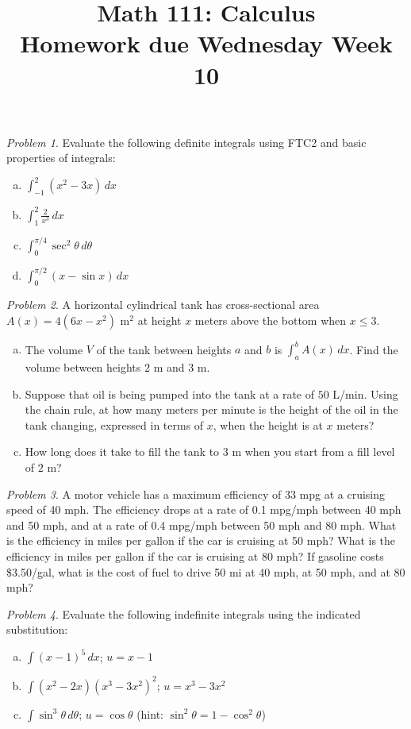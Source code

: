 \documentclass[11pt,twoside]{amsart}
\title{Math 111: Calculus\\ Homework due Wednesday Week 10}
\theoremstyle{plain}
\theoremstyle{remark}
\newtheorem{prob}{Problem}
\theoremstyle{definition}
\theoremstyle{definition}
\begin{document}
\maketitle

\begin{prob}
Evaluate the following definite integrals using FTC2 and basic properties of integrals:
\begin{enumerate}[(a)]
\item $\int_{-1}^2 (x^2-3x)\,dx$
\item $\int_{1}^2 \frac{2}{x^3}\,dx$
\item $\int_0^{\pi/4}\sec^2\theta\,d\theta$
\item $\int_0^{\pi/2}(x-\sin x)\,dx$
\end{enumerate}
\end{prob}

\begin{prob}
A horizontal cylindrical tank has cross-sectional area $A(x) = 4(6x-x^2)$ m$^2$ at height $x$ meters above the bottom when $x\le 3$.
\begin{enumerate}[(a)]
\item The volume $V$ of the tank between heights $a$ and $b$ is $\int_a^b A(x)\,dx$. Find the volume between heights $2$ m and $3$ m.
\item Suppose that oil is being pumped into the tank at a rate of $50$ L/min. Using the chain rule, at how many meters per minute is the height of the oil in the tank changing, expressed in terms of $x$, when the height is at $x$ meters?
\item How long does it take to fill the tank to $3$ m when you start from a fill level of $2$ m?
\end{enumerate}
\end{prob}

\begin{prob}
A motor vehicle has a maximum efficiency of 33 mpg at a cruising speed of 40 mph. The efficiency drops at a rate of 0.1 mpg/mph between 40 mph and 50 mph, and at a rate of 0.4 mpg/mph between 50 mph and 80 mph. What is the efficiency in miles per gallon if the car is cruising at 50 mph? What is the efficiency in miles per gallon if the car is cruising at 80 mph? If gasoline costs \$3.50/gal, what is the cost of fuel to drive 50 mi at 40 mph, at 50 mph, and at 80 mph?
\end{prob}

\begin{prob}
Evaluate the following indefinite integrals using the indicated substitution:
\begin{enumerate}[(a)]
\item $\int (x-1)^5\,dx$; $u=x-1$
\item $\int (x^2-2x)(x^3-3x^2)^2$; $u=x^3-3x^2$
\item $\int \sin^3\theta\,d\theta$; $u=\cos\theta$ (hint: $\sin^2\theta = 1-\cos^2\theta$)
\end{enumerate}
\end{prob}
\end{document}
